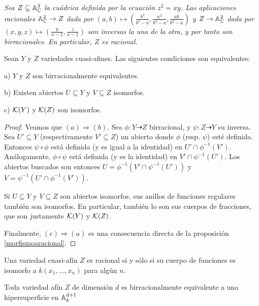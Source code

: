 \documentclass[ACGA.tex]{subfiles}
\begin{document}
 \begin{ejs}\emph{
  Sea $Z\subseteq\mathbb{A}^3_{\mathbb{C}}$ la cuádrica definida por la ecuación $z^2=xy$. Las aplicaciones racionales $\mathbb{A}^2_{\mathbb{C}}\to Z$ dada por $(a,b)\mapsto(\frac{b^2}{b^2-a},\frac{a^2}{b^2-a},\frac{ab}{b^2-a})$ y $Z\to\mathbb{A}^2_{\mathbb{C}}$ dada por $(x,y,z)\mapsto (\frac{y}{x-1},\frac{z}{x-1})$ son inversas la una de la otra, y por tanto son birracionales. En particular, $Z$ es racional.}
 \end{ejs}

\begin{prop}\label{birracional}
 Sean $Y$ y $Z$ variedades cuasi-afines. Las siguientes condiciones son equivalentes:

a) $Y$ y $Z$ son birracionalmente equivalentes.

b) Existen abiertos $U\subseteq Y$ y $V\subseteq Z$ isomorfos.

c) ${\mathcal K}(Y)$ y ${\mathcal K}(Z)$ son isomorfos. 

\end{prop}

\begin{proof}
 Veamos que $(a)\Rightarrow(b)$. Sea $\phi:Y\dashrightarrow Z$ birracional, y $\psi:Z\dashrightarrow Y$ su inversa. Sea $U'\subseteq Y$ (respectivamente $V'\subseteq Z$) un abierto donde $\phi$ (resp. $\psi$) esté definida. Entonces $\psi\circ\phi$ está definida (y es igual a la identidad) en $U'\cap \phi^{-1}(V')$. Análogamente, $\phi\circ\psi$ está definida (y es la identidad) en $V'\cap\psi^{-1}(U')$. Los abiertos buscados son entonces $U=\phi^{-1}(V'\cap\psi^{-1}(U'))$ y $V=\psi^{-1}(U'\cap \phi^{-1}(V'))$.

Si $U\subseteq Y$ y $V\subseteq Z$ son abiertos isomorfos, sus anillos de funciones regulares también son isomorfos. En particular, también lo son sus cuerpos de fracciones, que son justamente ${\mathcal K}(Y)$ y ${\mathcal K}(Z)$. 

Finalmente, $(c)\Rightarrow(a)$ es una consecuencia directa de la proposición \ref{morfismoaracional}.
\end{proof}

\begin{coro}
 Una variedad cuasi-afín $Z$ es racional si y sólo si su cuerpo de funciones es isomorfo a $k(x_1,\ldots,x_n)$ para algún $n$.
\end{coro}

\begin{coro}\label{behipersuperficie}
 Toda variedad afín $Z$ de dimensión $d$ es birracionalmente equivalente a una hipersuperficie en $\mathbb{A}^{d+1}_k$
\end{coro}
\end{document}
